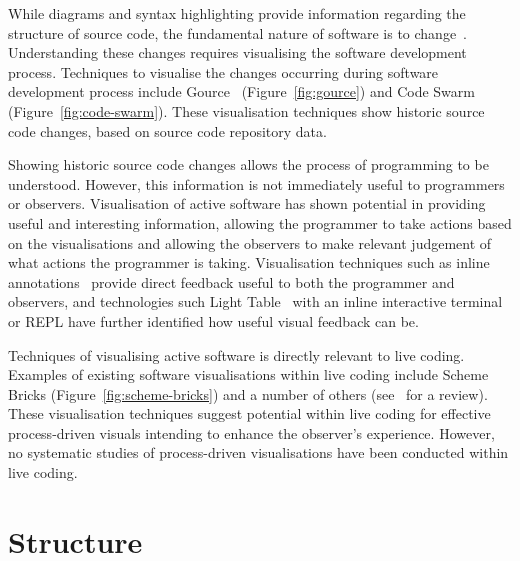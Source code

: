 While diagrams and syntax highlighting provide information regarding the structure of source code, the fundamental nature of software is to change~\cite{Brooks1995}. Understanding these changes requires visualising the software development process. Techniques to visualise the changes occurring during software development process include Gource~\cite{Caudwell2010} (Figure~\ref{fig:gource}) and Code Swarm~\cite{Ogawa2012} (Figure~\ref{fig:code-swarm}). These visualisation techniques show historic source code changes, based on source code repository data.



  

Showing historic source code changes allows the process of programming to be understood. However, this information is not immediately useful to programmers or observers. Visualisation of active software has shown potential in providing useful and interesting information, allowing the programmer to take actions based on the visualisations and allowing the observers to make relevant judgement of what actions the programmer is taking. Visualisation techniques such as inline annotations~\cite{Swift2013,Beck2013} provide direct feedback useful to both the programmer and observers, and technologies such Light Table~\cite{Kodowa2014} with an inline interactive terminal or \ac{REPL} have further identified how useful visual feedback can be.

Techniques of visualising active software is directly relevant to live coding. Examples of existing software visualisations within live coding include Scheme Bricks (Figure~\ref{fig:scheme-bricks}) and a number of others (see~\cite{McLean2010a} for a review). These visualisation techniques suggest potential within live coding for effective process-driven visuals intending to enhance the observer's experience. However, no systematic studies of process-driven visualisations have been conducted within live coding.


\section{Structure}

